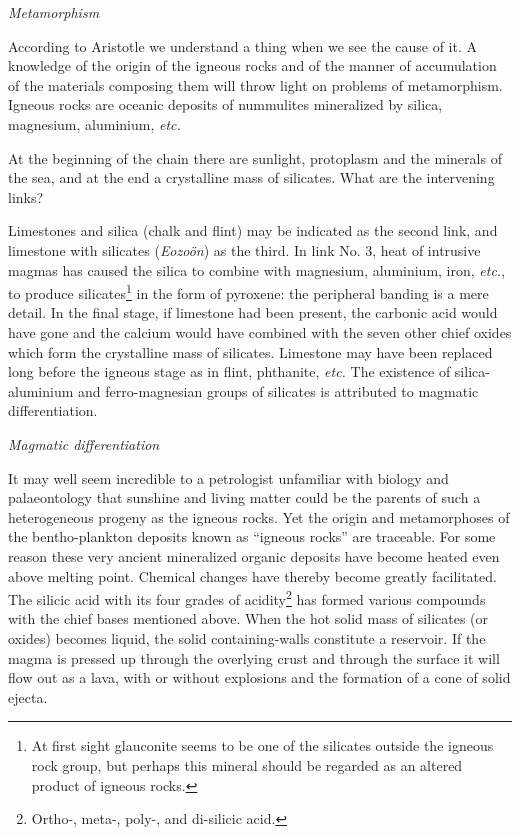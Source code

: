 \documentclass[a4paper, 12pt, oneside]{article}
\begin{document}
\bigskip
\centerline{\emph{Metamorphism}}

According to Aristotle we understand a thing when we see the cause of it. A knowledge of the origin of the igneous rocks and of the manner of accumulation of the materials composing them will throw light on problems of metamorphism. Igneous rocks are oceanic deposits of nummulites mineralized by silica, magnesium, aluminium, \emph{etc.}

At the beginning of the chain there are sunlight, protoplasm and the minerals of the sea, and at the end a crystalline mass of silicates. What are the intervening links?

Limestones and silica (chalk and flint) may be indicated as the second link, and limestone with silicates (\emph{Eozoön}) as the third. In link No. 3, heat of intrusive magmas has caused the silica to combine with magnesium, aluminium, iron, \emph{etc.}, to produce silicates\footnote{At first sight glauconite seems to be one of the silicates outside the igneous rock group, but perhaps this mineral should be regarded as an altered product of igneous rocks.} in the form of pyroxene: the peripheral banding is a mere detail. In the final stage, if limestone had been present, the carbonic acid would have gone and the calcium would have combined with the seven other chief oxides which form the crystalline mass of silicates. Limestone may have been replaced long before the igneous stage as in flint, phthanite, \emph{etc.} The existence of silica-aluminium and ferro-magnesian groups of silicates is attributed to magmatic differentiation.

\bigskip
\centerline{\emph{Magmatic differentiation}}

It may well seem incredible to a petrologist unfamiliar with biology and palaeontology that sunshine and living matter could be the parents of such a heterogeneous progeny as the igneous rocks. Yet the origin and metamorphoses of the bentho-plankton deposits known as ``igneous rocks'' are traceable. For some reason these very ancient mineralized organic deposits have become heated even above melting point. Chemical changes have thereby become greatly facilitated. The silicic acid with its four grades of acidity\footnote{Ortho-, meta-, poly-, and di-silicic acid.} has formed various compounds with the chief bases mentioned above. When the hot solid mass of silicates (or oxides) becomes liquid, the solid containing-walls constitute a reservoir. If the magma is pressed up through the overlying crust and through the surface it will flow out as a lava, with or without explosions and the formation of a cone of solid ejecta.
\end{document}
